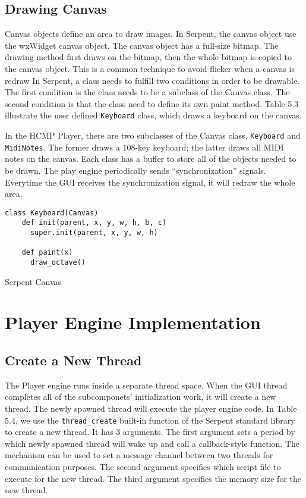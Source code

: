 \subsection{Drawing Canvas}
 
Canvas objects define an area to draw images. In Serpent, the canvas 
object use the wxWidget canvas object. The canvas object has a full-size bitmap.
The drawing method first draws on the bitmap, then the whole bitmap is copied 
to the canvas object. This is a common technique to avoid flicker when a canvas is 
redraw In Serpent, a class needs to fulfill two conditions in order 
to be drawable. The first condition is
the class needs to be a subclass of the Canvas class. The second condition is that 
the class need to define its own paint method. Table 5.3 illustrate the user 
defined \texttt{Keyboard} class, which draws a keyboard on the canvas.

In the HCMP Player, there are two subclasses of the Canvas class, 
\texttt{Keyboard} and \texttt{MidiNotes}. The former draws a 108-key 
keyboard; the latter draws all MIDI notes on the canvas. Each class has a buffer 
to store all of the objects needed to be drawn. The play engine periodically 
sends ``synchronization'' signals. Everytime the GUI receives the synchronization 
signal, it will redraw the whole area.

\begin{table}[htdp]
\centering

\begin{lstlisting}
class Keyboard(Canvas)
    def init(parent, x, y, w, h, b, c)
      super.init(parent, x, y, w, h)

    def paint(x)
      draw_octave()
\end{lstlisting}
\caption[Serpent Canvas]{Serpent Canvas}
\end{table}

\section{Player Engine Implementation}

\subsection{Create a New Thread}
The Player engine runs inside a separate thread space. When the GUI thread completes 
all of the subcomponets' initialization work, it will create a new thread. The newly
spawned thread will execute the player engine code. In Table 5.4, we use the   
\texttt{thread\_create} built-in function of the Serpent standard library to create 
a new thread. It has 3 arguments. 
The first argument sets a period by which newly spawned thread will wake up and call 
a callback-style function. The mechanism can be used to set a message channel between 
two threads for communication purposes. The second argument specifies 
which script file to execute for the new thread. The third argument specifies the 
memory size for the new thread.

